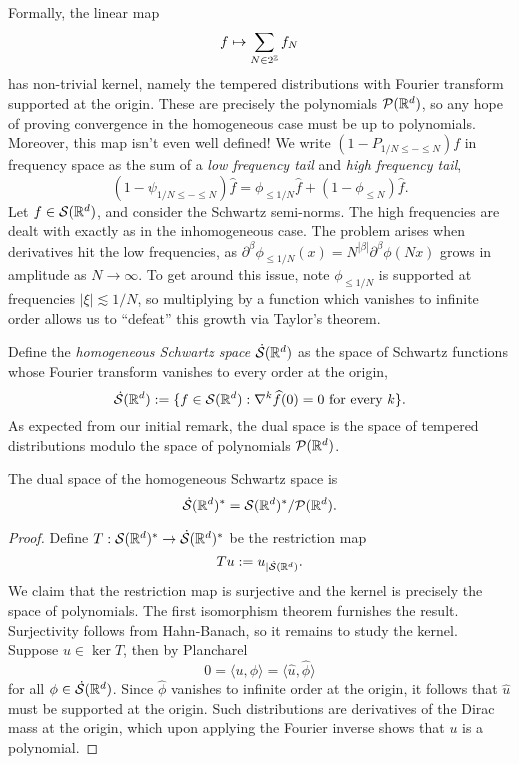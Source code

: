 Formally, the linear map
	\[ f \mapsto \sum_{N \in 2^\mathbb Z} f_N \]
has non-trivial kernel, namely the tempered distributions with Fourier transform supported at the origin. These are precisely the polynomials $\mathcal P (\mathbb R^d)$, so any hope of proving convergence in the homogeneous case must be up to polynomials. Moreover, this map isn't even well defined! We write $(1 - P_{1/N \leq - \leq N}) f$ in frequency space as the sum of a \textit{low frequency tail} and \textit{high frequency tail},
	\[ (1 - \psi_{1/N \leq - \leq N}) \widehat f = \phi_{\leq 1/N} \widehat f + (1 - \phi_{\leq N}) \widehat f .\]
Let $f \in \mathcal S (\mathbb R^d)$, and consider the Schwartz semi-norms. The high frequencies are dealt with exactly as in the inhomogeneous case. The problem arises when derivatives hit the low frequencies, as $\partial^\beta \phi_{\leq 1/N} (x) = N^{|\beta|} \partial^\beta \phi(Nx)$ grows in amplitude as $N \to \infty$. To get around this issue, note $\phi_{\leq 1/N}$ is supported at frequencies $|\xi| \lesssim 1/N$, so multiplying by a function which vanishes to infinite order allows us to ``defeat'' this growth via Taylor's theorem. 

Define the \emph{homogeneous Schwartz space} $\dot {\mathcal S} (\mathbb R^d)$ as the space of Schwartz functions whose Fourier transform vanishes to every order at the origin, 
	\[\dot {\mathcal S} (\mathbb R^d) := \{ f \in \mathcal S (\mathbb R^d) : \nabla^k \widehat f (0) = 0 \text{ for every $k$} \}. \]
As expected from our initial remark, the dual space is the space of tempered distributions modulo the space of polynomials $\mathcal P (\mathbb R^d)$.

\begin{proposition}
	The dual space of the homogeneous Schwartz space is
		\[ \dot {\mathcal S} (\mathbb R^d)^* = \mathcal S(\mathbb R^d)^* / \mathcal P (\mathbb R^d). \]
\end{proposition}

\begin{proof}
	Define $T: \mathcal S (\mathbb R^d)^* \to \dot {\mathcal S} (\mathbb R^d)^*$ be the restriction map
		\[ T u := u_{|\dot {\mathcal S} (\mathbb R^d)}.  \]
	We claim that the restriction map is surjective and the kernel is precisely the space of polynomials. The first isomorphism theorem furnishes the result. Surjectivity follows from Hahn-Banach, so it remains to study the kernel. 	Suppose $u \in \operatorname{ker} T$, then by Plancharel 
		\[ 0 = \langle u, \phi \rangle = \langle \widehat u, \widehat \phi \rangle \]
	for all $\phi \in \dot {\mathcal S} (\mathbb R^d)$. Since $\widehat \phi$ vanishes to infinite order at the origin, it follows that $\widehat u$ must be supported at the origin. Such distributions are derivatives of the Dirac mass at the origin, which upon applying the Fourier inverse shows that $u$ is a polynomial. 
\end{proof}	

